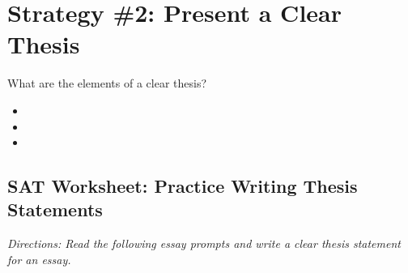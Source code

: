 \section{Strategy \#2: Present a Clear Thesis}

What are the elements of a clear thesis?

\begin{itemize}

\item \hrulefill

\item \hrulefill

\item \hrulefill

\end{itemize}

\subsection{SAT Worksheet: Practice Writing Thesis Statements}

\textit{Directions: Read the following essay prompts and write a clear thesis statement for an essay.}

